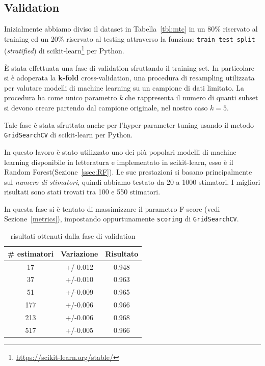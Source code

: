 \subsection{Validation}
\label{ssec:validation_Topic}
Inizialmente abbiamo diviso il dataset in Tabella~\ref{tbl:mtc} in un 80\% riservato al training ed un 20\% riservato al testing attraverso la funzione {\tt train\_test\_split} (\textit{stratified}) di scikit-learn\footnote{\url{https://scikit-learn.org/stable/}} per Python.

È stata effettuata una fase di validation sfruttando il training set. In particolare si è adoperata la \textbf{k-fold} cross-validation, una procedura di resampling utilizzata per valutare modelli di machine learning su un campione di dati limitato. La procedura ha come unico parametro \textit{k} che rappresenta il numero di quanti subset si devono creare partendo dal campione originale, nel nostro caso $ k = 5 $.

Tale fase è stata sfruttata anche per l'hyper-parameter tuning usando il metodo {\tt GridSearchCV} di scikit-learn per Python.

In questo lavoro è stato utilizzato uno dei più popolari modelli di machine learning disponibile in letteratura e implementato in scikit-learn, esso è il Random Forest(Sezione~\ref{ssec:RF}). Le sue prestazioni si basano principalmente sul \textit{numero di stimatori}, quindi abbiamo testato da 20 a 1000 stimatori. I migliori risultati sono stati trovati tra 100 e 550 stimatori.

In questa fase si è tentato di massimizzare il parametro F-score (vedi Sezione~\ref{metrics}), impostando oppurtunamente {\tt scoring} di {\tt GridSearchCV}.

\begin{table}[h]
\centering
\begin{tabular}{|c|c|c|}
\hline
\textbf{\# estimatori} & \textbf{Variazione} & \textbf{Risultato} \\ \hline
17 & +/-0.012 & 0.948 \\ \hline
37 & +/-0.010 & 0.963 \\ \hline
51 & +/-0.009 & 0.965 \\ \hline
177 & +/-0.006 & 0.966 \\ \hline
213 & +/-0.006 & 0.968 \\ \hline
517 & +/-0.005 & 0.966 \\ \hline
\end{tabular}
\caption{risultati ottenuti dalla fase di validation}
\label{tab:validationresult}
\end{table}
\FloatBarrier


